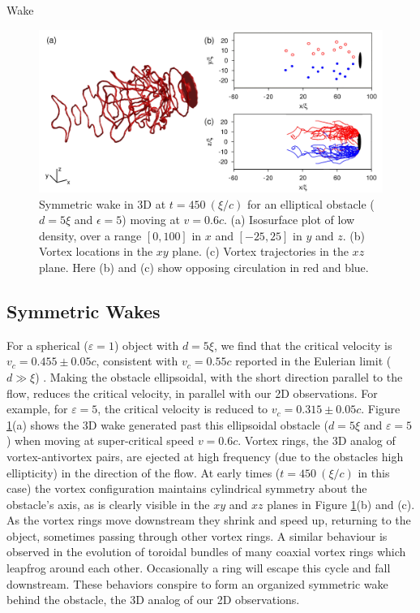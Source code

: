 \begin{chapter}{\label{cha:wake}Wake}
\begin{figure}
\centering
\includegraphics[width=\textwidth]{wake/figure7}
\caption{\label{fig:3d1} Symmetric wake in 3D at $t=450~(\xi/c)$ for an elliptical obstacle ($d=5\xi$ and $\epsilon=5$) moving at $v=0.6c$.  (a) Isosurface plot of low density, over a range $[0,100]$ in $x$ and $[-25,25]$ in $y$ and $z$. (b) Vortex locations in the $xy$ plane.  (c) Vortex trajectories in the $xz$ plane.  Here (b) and (c) show opposing circulation in red and blue.}
\end{figure}
\subsection{Symmetric Wakes} 
For a spherical ($\varepsilon=1$) object with $d=5\xi$, we find that the critical velocity is $v_c=0.455\pm 0.05 c$, consistent with $v_c=0.55c$ reported in the Eulerian limit ($d \gg \xi$) \cite{win01,winiecki99}.  Making the obstacle ellipsoidal, with the short direction parallel to the flow, reduces the critical velocity, in parallel with our 2D observations.  For example, for $\varepsilon=5$, the critical velocity is reduced to $v_c=0.315 \pm 0.05c$.  Figure \ref{fig:3d1}(a) shows the 3D wake generated past this ellipsoidal obstacle ($d=5\xi$ and $\varepsilon = 5$) when moving at super-critical speed $v=0.6c$.  Vortex rings, the 3D analog of vortex-antivortex pairs, are ejected at high frequency (due to the obstacles high ellipticity) in the direction of the flow.  At early times ($t=450~(\xi/c)$ in this case) the vortex configuration maintains cylindrical symmetry about the obstacle's axis, as is clearly visible in the $xy$ and $xz$ planes in Figure \ref{fig:3d1}(b) and (c).  As the vortex rings move downstream they shrink and speed up, returning to the object, sometimes passing through other vortex rings. A similar behaviour is observed \cite{wacks} in the evolution of toroidal bundles of many coaxial vortex rings which leapfrog around each other.  Occasionally a ring will escape this cycle and fall downstream.  These behaviors conspire to form an organized symmetric wake behind the obstacle,  the 3D analog of our 2D observations.  



\end{chapter}
